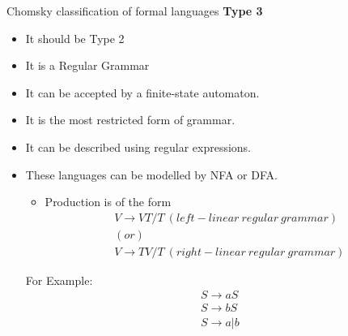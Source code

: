\documentclass{beamer}
\begin{document}
\begin{frame}{Chomsky classification of formal languages}
	\textbf{Type 3}
	\begin{itemize}
		\item It should be Type 2
		\item It is a Regular Grammar
		\item It can be accepted by a finite-state automaton.
		\item It is the most restricted form of grammar.
		\item It can be described using regular expressions.
		\item These languages can be modelled by NFA or DFA.
		\begin{itemize}
			\item  Production is of the form 
			\begin{eqnarray*}
				V \rightarrow VT / T\  (left- linear\  regular\  grammar) \\
				(or) \\
				V \rightarrow TV /T\  (right - linear\  regular\  grammar)
			\end{eqnarray*}
		\end{itemize}
	 For Example:
	\begin{eqnarray*}
		S \rightarrow aS\\ S \rightarrow bS\\ S \rightarrow a \big | b
	\end{eqnarray*}
	\end{itemize}
	
\end{frame}
\end{document}

